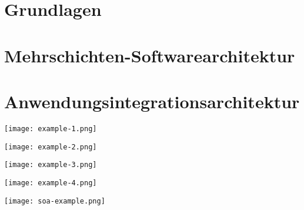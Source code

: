 





\newcommand{\TITLE}{Test Cheat Sheet}
\newcommand{\DELIVERYDATE}{22.02.2021}


    \setlength{\columnseprule}{0.4pt}
    \footnotesize
    \begin{multicols*}{4}
        \setlength{\columnseprule}{0.4pt}
        \section{Grundlagen}
        
        \vfill\null
        \columnbreak
        
        \newpage
        \section{Mehrschichten-Softwarearchitektur}
        
        \vfill\null
        \columnbreak
        
        \vfill\null
        \columnbreak
        
        \vfill\null
        \columnbreak
        
        \newpage
        \section{Anwendungsintegrationsarchitektur}
        
        \vfill\null
        \columnbreak
        
        \vfill\null
        \columnbreak
        
        \vfill\null
        \columnbreak
        


    \end{multicols*}

    \begin{multicols*}{2}
        \setlength{\columnseprule}{0.4pt}

        \texttt{[image: example-1.png]}

        \texttt{[image: example-2.png]}

        \texttt{[image: example-3.png]}

        \texttt{[image: example-4.png]}

        \texttt{[image: soa-example.png]}
    \end{multicols*}


